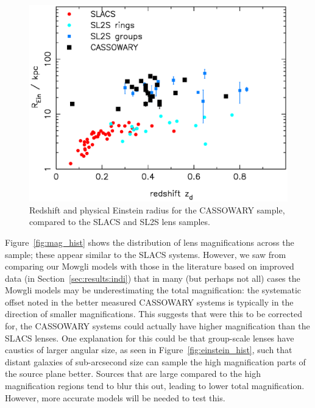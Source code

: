 \documentclass[iop]{emulateapj}
\def\theapplet{{\sc Mowgli}\xspace}
\begin{document}
\begin{figure}[!ht]
	\centering\includegraphics[width=\linewidth]{figs/zd-Rein.ps}
  \caption{Redshift and physical Einstein radius for the CASSOWARY sample,
  compared to the SLACS and SL2S lens samples.}
  \label{fig:zd-Rein}
\end{figure}

Figure~\ref{fig:mag_hist} shows the distribution of lens magnifications across
the sample; these appear similar to the SLACS systems. However,  we saw from
comparing our \theapplet models with those in the literature based on improved
data (in Section~\ref{sec:results:indi}) that in many (but perhaps not all)
cases the \theapplet models may be underestimating the total magnification:
the  systematic offset noted in the better measured CASSOWARY systems is
typically  in the direction of smaller magnifications. This suggests that were
this to be corrected for, the CASSOWARY systems could actually have higher
magnification than the SLACS lenses. One explanation for this could be that
group-scale lenses have caustics of larger angular size, as seen in 
Figure~\ref{fig:einstein_hist}, such that distant galaxies of sub-arcsecond
size can sample the high magnification parts of the source plane better.
Sources that are large compared to the high magnification regions tend to blur
this out, leading to lower total magnification. However, more accurate models
will be needed to test this. 
\end{document}

